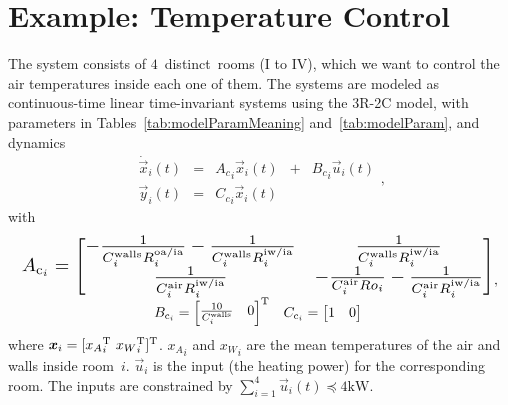 \documentclass{ifacconf}  %
\begin{document}
\section{Example: Temperature Control}\label{sec:App_dMPC}
The system consists of $4$~distinct~rooms (I to IV), which we want to control the air temperatures inside each one of them.
The systems are modeled as continuous-time linear \mbox{time-invariant} systems using the \mbox{3R-2C} model, with parameters in Tables~\ref{tab:modelParamMeaning} and~\ref{tab:modelParam}, and dynamics
\begin{equation}
\begin{matrix}
  \label{eq:systems_cont}
\dot{\vec{x}}_{i}(t)&=&{A_{c}}_{i}\vec{x}_{i}(t) &+& {B_{c}}_{i}\vec{u}_{i}(t)\\
\vec{y}_{i}(t)&=&{C_{c}}_{i}\vec{x}_{i}(t) &&
\end{matrix},
\end{equation}
with
\begin{equation*}
  \label{eq:room_system}
  \begin{matrix}
\resizebox{.98\columnwidth}{!}{$
  A_{\mathrm{c}_{i}}=\left[
    \begin{matrix}
      -\frac{1}{C^{\text{walls}}_{i}R^{\text{oa/ia}}_{i}}-\frac{1}{C^{\text{walls}}_{i}R^{\text{iw/ia}}_{i}}& \frac{1}{C^{\text{walls}}_{i}R^{\text{iw/ia}}_{i}}\\
      \frac{1}{C^{\text{air}}_{i}R^{\text{iw/ia}}_{i}} &-\frac{1}{C^{\text{air}}_{i}Ro_{i}}-\frac{1}{C^{\text{air}}_{i}R^{\text{iw/ia}}_{i}}
    \end{matrix}\right]
    $}
  \\
  \begin{matrix}
    B_{\mathrm{c}_{i}}=\left[
      \begin{matrix}  \frac{10}{C^{\text{walls}}_{i}}& 0\end{matrix}
    \right]\T&C_{\mathrm{c}_{i}}=\left[\begin{matrix}1 & 0\end{matrix}\right]
  \end{matrix}
  \end{matrix},
\end{equation*}
where ${\vec{x}_{i}=[{{x}_{A}}_{i}\T\ {{x}_{W}}_{i}\T]\T}$. ${x_A}_i$ and ${x_W}_i$ are the mean temperatures of the air and walls inside room~$i$. $\vec{u}_{i}$ is the input (the heating power)
for the corresponding room. The inputs are constrained by ${\sum_{i=1}^{4}\vec{u}_{i}(t)\preceq 4\mathrm{kW}}$.
\end{document}
